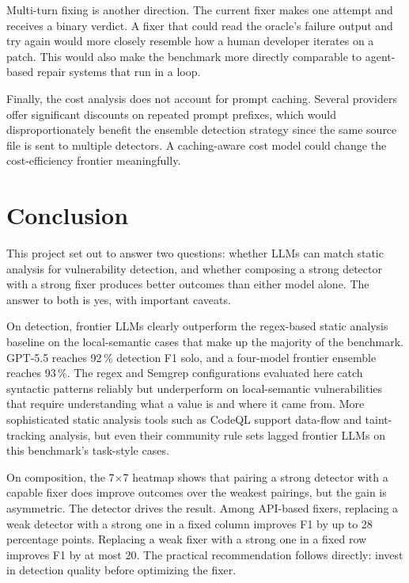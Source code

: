 \documentclass[12pt]{article}
\begin{document}
Multi-turn fixing is another direction. The current fixer makes one attempt
and receives a binary verdict. A fixer that could read the oracle's failure
output and try again would more closely resemble how a human developer
iterates on a patch. This would also make the benchmark more directly
comparable to agent-based repair systems that run in a loop.

Finally, the cost analysis does not account for prompt caching. Several
providers offer significant discounts on repeated prompt prefixes, which
would disproportionately benefit the ensemble detection strategy since the
same source file is sent to multiple detectors. A caching-aware cost model
could change the cost-efficiency frontier meaningfully.

\section{Conclusion}

This project set out to answer two questions: whether LLMs can match static
analysis for vulnerability detection, and whether composing a strong detector
with a strong fixer produces better outcomes than either model alone. The
answer to both is yes, with important caveats.

On detection, frontier LLMs clearly outperform the regex-based static analysis
baseline on the local-semantic cases that make up the majority of the
benchmark. GPT-5.5 reaches 92\,\% detection F1 solo, and a four-model
frontier ensemble reaches 93\,\%. The regex and Semgrep configurations evaluated here catch syntactic patterns
reliably but underperform on local-semantic vulnerabilities that require
understanding what a value is and where it came from. More sophisticated static
analysis tools such as CodeQL support data-flow and taint-tracking analysis,
but even their community rule sets lagged frontier LLMs on this benchmark's
task-style cases.

On composition, the 7$\times$7 heatmap shows that pairing a strong detector
with a capable fixer does improve outcomes over the weakest pairings, but the
gain is asymmetric. The detector drives the result. Among API-based fixers, replacing a weak
detector with a strong one in a fixed column improves F1 by up to 28 percentage
points. Replacing a weak fixer with a strong one in a fixed row improves F1
by at most 20. The practical recommendation follows directly: invest in
detection quality before optimizing the fixer.
\end{document}
